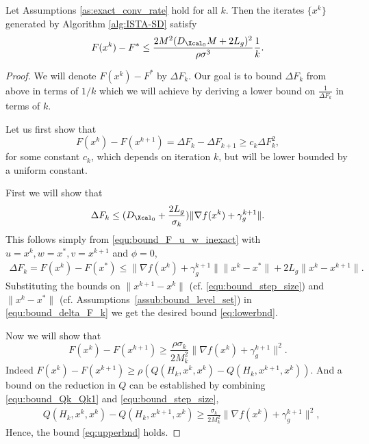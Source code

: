 \documentclass[11pt]{article}
\numberwithin{equation}{section}
\begin{document}
\begin{theorem}\label{the:ISTA-SD}
Let Assumptions \ref{as:exact_conv_rate} hold for all $k$.
Then the iterates $\{x^k\}$ generated by Algorithm \ref{alg:ISTA-SD} satisfy
\begin{align}
    \label{the:ISTA-nonsmooth-conclude} 
    F(x^k)-F^* \leq  \frac{2M^2 (D_{\Xcal_0} M+2L_g)^2}{\rho\sigma^3}\frac{1}{k}.
\end{align}
\end{theorem}
\begin{proof}
	We will denote $F(x^k)-F^*$ by $\Delta F_k$.  Our goal is to bound $\Delta F_k$ from above  in terms of $1/k$ which
	 we will achieve by deriving a lower bound  on $\frac{1}{\Delta F_k}$ in terms of $k$. 

	Let us first show that 
	\begin{equation}\label{eq:mainbnd}
	F(x^{k})-F(x^{k+1})=\Delta F_k-\Delta F_{k+1}\geq c_k \Delta F_k^2,
	\end{equation}
	for some constant $c_k$, which depends on iteration $k$, but will be lower bounded by a uniform constant. 

	First we will show that 
	\begin{equation}\label{eq:lowerbnd}
	\Delta F_k\leq (D_{\Xcal_0}+\frac{2L_g}{\sigma_k}) \|\nabla f(x^k)+\gamma_g^{k+1}\|.
	\end{equation}
	This follows simply from \eqref{equ:bound_F_u_w_inexact} with $u = x^k, w = x^*, v = x^{k+1}$ and $\phi = 0$,
	\begin{align}
	\label{equ:bound_delta_F_k}
	    \Delta F_k = F(x^k) - F(x^*)
	    \leq \|\nabla f(x^k)+\gamma_{g}^{k+1}\|\|x^k-x^*\| + 2L_g \|x^k-x^{k+1}\|. 
	\end{align}
	Substituting the bounds on  $\| x^{k+1} - x^k\|$ (cf. \eqref{equ:bound_step_size}) and   $\| x^{k} - x^*\|$ (cf. Assumptions~\ref{assub:bound_level_set})
	in \eqref{equ:bound_delta_F_k} we get
	the desired bound \eqref{eq:lowerbnd}.  

	Now we will show that 
	\begin{equation}\label{eq:upperbnd}
		F(x^k) - F(x^{k+1})\geq \frac{\rho\sigma_k}{2M_k^2}\|\nabla f(x^k)+\gamma_g^{k+1}\|^2.
	\end{equation}
	Indeed $F(x^{k})-F(x^{k+1})\geq \rho (Q(H_k, x^{k}, x^k)-Q(H_k,x^{k+1}, x^k))$. And a bound on the reduction in $Q$ can be established by combining \eqref{equ:bound_Qk_Qk1} and \eqref{equ:bound_step_size},
    \begin{align*}
	    &Q(H_k,x^k,x^k) - Q(H_k,x^{k+1}, x^k) \geq \frac{\sigma_k}{2M_k^2}   \| \nabla f(x^k) + \gamma_g^{k+1}\| ^2,  
    \end{align*}
	Hence, the bound \eqref{eq:upperbnd} holds.




\end{proof}
\end{document}
